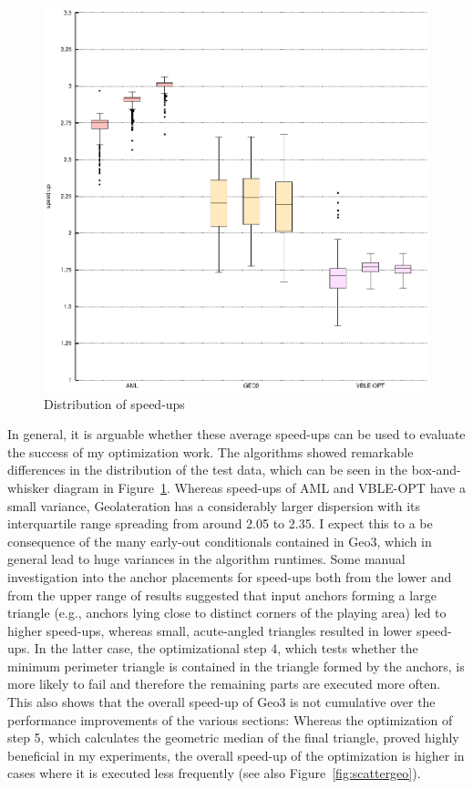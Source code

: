 \begin{figure}
\begin{center}
\includegraphics{img/boxplot}
\end{center}
\caption{Distribution of speed-ups}
\label{fig:boxplot}
\end{figure}

In general, it is arguable whether these average speed-ups can be used to evaluate the success of my optimization work. The algorithms showed remarkable differences in the distribution of the test data, which can be seen in the box-and-whisker diagram in Figure~\ref{fig:boxplot}. Whereas speed-ups of AML and VBLE-OPT have a small variance, Geolateration has a considerably larger dispersion with its interquartile range spreading from around 2.05 to 2.35. I expect this to a be consequence of the many early-out conditionals contained in Geo3, which in general lead to huge variances in the algorithm runtimes. Some manual investigation into the anchor placements for speed-ups both from the lower and from the upper range of results suggested that input anchors forming a large triangle (e.g., anchors lying close to distinct corners of the playing area) led to higher speed-ups, whereas small, acute-angled triangles resulted in lower speed-ups. In the latter case, the optimizational step 4, which tests whether the minimum perimeter triangle is contained in the triangle formed by the anchors, is more likely to fail and therefore the remaining parts are executed more often. This also shows that the overall speed-up of Geo3 is not cumulative over the performance improvements of the various sections: Whereas the optimization of step 5, which calculates the geometric median of the final triangle, proved highly beneficial in my experiments, the overall speed-up of the optimization is higher in cases where it is executed less frequently (see also Figure~\ref{fig:scattergeo}).

